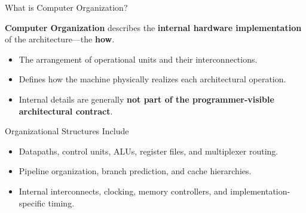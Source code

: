 \documentclass[aspectratio=169,11pt,t]{beamer}
\newcommand{\key}[1]{\textbf{#1}}
\begin{document}
\begin{frame}{What is Computer Organization?}

\key{Computer Organization}
describes the
\key{internal hardware implementation}
of the architecture---the \key{how}.

\vspace{0.2em}

\begin{itemize}
  \item The arrangement of operational units
        and their interconnections.
  \item Defines how the machine physically realizes
        each architectural operation.
  \item Internal details are generally
        \key{not part of the programmer-visible
        architectural contract}.
\end{itemize}

\vspace{0.25em}

\begin{block}{Organizational Structures Include}

\begin{itemize}
  \item Datapaths,
        control units,
        ALUs,
        register files,
        and multiplexer routing.
  \item Pipeline organization,
        branch prediction,
        and cache hierarchies.
  \item Internal interconnects,
        clocking,
        memory controllers,
        and implementation-specific timing.
\end{itemize}

\end{block}

\end{frame}



\end{document}
